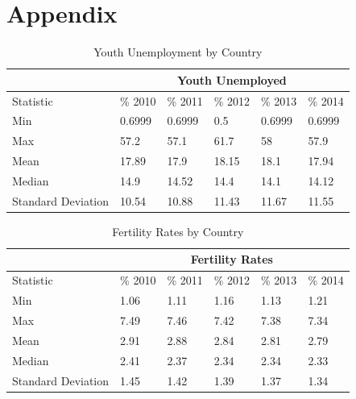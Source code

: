 \documentclass{article}
\begin{document}
\section{Appendix} 
\begin{table}[ht]
\centering
\begin{tabular}{|l|l|l|l|l|l|}
\hline
          &  \multicolumn{5}{c|}{Youth Unemployed} \\ \hline
Statistic          &  \%  2010 &  \% 2011 &  \% 2012 &  \%  2013 & \% 2014 \\ \hline
Min                & 0.6999                    & 0.6999                    & 0.5                       & 0.6999                    & 0.6999                    \\ \hline
Max                & 57.2                      & 57.1                      & 61.7                      & 58                        & 57.9                      \\ \hline
Mean               & 17.89                     & 17.9                      & 18.15                     & 18.1                      & 17.94                     \\ \hline
Median             & 14.9                      & 14.52                     & 14.4                      & 14.1                      & 14.12                     \\ \hline
Standard Deviation & 10.54                     & 10.88                     & 11.43                     & 11.67                     & 11.55                     \\ \hline
\end{tabular}
\caption{Youth Unemployment by Country}
\label{summary-statistic-table-youth-unemployment}
\end{table}
\begin{table}[ht]
\centering
\begin{tabular}{|l|l|l|l|l|l|}
\hline
          &  \multicolumn{5}{c|}{Fertility Rates} \\ \hline
Statistic          &  \%  2010 &  \% 2011 &  \% 2012 &  \%  2013 & \% 2014 \\ \hline
Min                & 1.06                   & 1.11                   & 1.16                   & 1.13                   & 1.21                   \\ \hline
Max                & 7.49                   & 7.46                   & 7.42                   & 7.38                   & 7.34                   \\ \hline
Mean               & 2.91                   & 2.88                   & 2.84                   & 2.81                   & 2.79                   \\ \hline
Median             & 2.41                   & 2.37                   & 2.34                   & 2.34                   & 2.33                   \\ \hline
Standard Deviation & 1.45                   & 1.42                   & 1.39                   & 1.37                   & 1.34                   \\ \hline
\end{tabular}
\caption{Fertility Rates by Country}
\label{summary-statistic-table-fertility}
\end{table}
\end{document}
